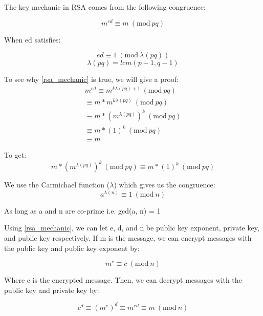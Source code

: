 \documentclass[acmlarge]{acmart}
\newcommand{\Mod}[1]{\ (\mathrm{mod}\ #1)}
\begin{document}
The key mechanic in RSA comes from the following congruence:

\begin{equation}
\label{rsa_mechanic}
	m^{ed} \equiv m \Mod{pq}
\end{equation}

When ed satisfies:

\begin{equation}
\label{ed_equiv}
	ed \equiv 1 \Mod{\lambda(pq)}
\end{equation}
\begin{equation}
\label{carmichael}
	\lambda(pq) = lcm(p - 1, q - 1)
\end{equation}

To see why \ref{rsa_mechanic} is true, we will give a proof:
\begin{equation}
\begin{split}
	m^{ed} 
	\equiv m^{k\lambda(pq) + 1} \Mod{pq} \\
	\equiv m * m^{k\lambda(pq)} \Mod{pq} \\
	\equiv m * (m^{\lambda(pq)})^{k} \Mod{pq} \\
	\equiv m * (1)^{k} \Mod{pq} \\
	\equiv m
\end{split}
\end{equation}

To get:
\begin{equation}
	m * (m^{\lambda(pq)})^{k} \Mod{pq} \equiv m * (1)^{k} \Mod{pq}
\end{equation}

We use the Carmichael function ($\lambda$) which gives us the congruence:
\begin{equation}
\label{carmichael_fun}
	a^{\lambda(n)} \equiv 1 \Mod{n}
\end{equation}

As long as a and n are co-prime i.e. gcd(a, n) = 1

Using \ref{rsa_mechanic}, we can let e, d, and n be public key exponent, private key, and public key respectively. If m is the message, we can encrypt messages with the public key and public key exponent by:

\begin{equation}
	m^{e} \equiv c \Mod{n}
\end{equation}

Where c is the encrypted message. Then, we can decrypt messages with the public key and private key by:

\begin{equation}
	c^{d} \equiv (m^{e})^{d} \equiv m^{ed} \equiv m \Mod{n}
\end{equation}
\end{document}
